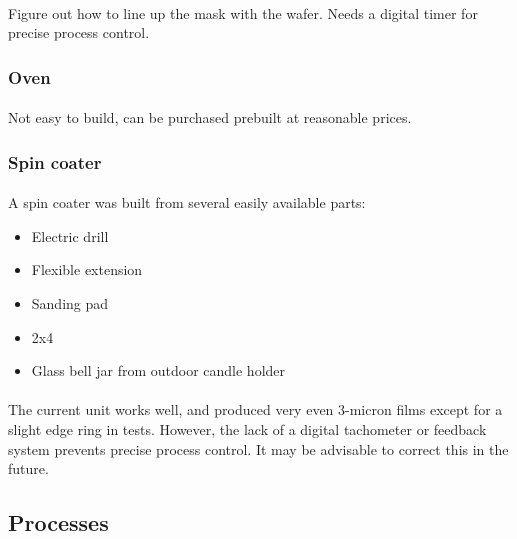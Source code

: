 \paragraph*{}
Figure out how to line up the mask with the wafer. Needs a digital timer for precise process control.

\subsubsection{Oven}
\paragraph*{}
Not easy to build, can be purchased prebuilt at reasonable prices.

\subsubsection{Spin coater}
\paragraph*{}
A spin coater was built from several easily available parts:
\begin{itemize}
\item Electric drill
\item Flexible extension
\item Sanding pad
\item 2x4
\item Glass bell jar from outdoor candle holder
\end{itemize}

\paragraph*{}
The current unit works well, and produced very even 3-micron films except for a slight edge ring in tests. However, the lack of
a digital tachometer or feedback system prevents precise process control. It may be advisable to correct this in the future.

\subsection{Processes}

